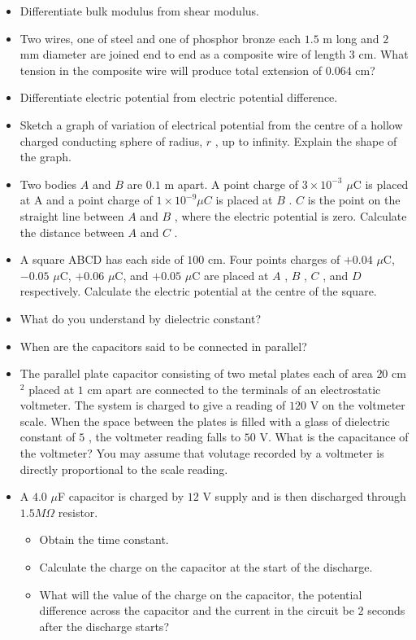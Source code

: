 \documentclass{article}
\begin{document}
\begin{itemize}
\item Differentiate bulk modulus from shear modulus.
\item Two wires, one of steel and one of phosphor bronze each $ 1.5$ m long and $ 2$ mm diameter are joined end to end as a composite wire of length $ 3$ cm.  What tension in the composite wire will produce total extension of $ 0.064$ cm?
\item Differentiate electric potential from electric potential difference.
\item Sketch a graph of variation of electrical potential from the centre of a hollow charged conducting sphere of radius, $ r$ , up to infinity.  Explain the shape of the graph.
\item Two bodies $ A$ and $ B$ are $ 0.1$ m apart.  A point charge of $ 3\times 10^{-3}$ $\mu$C is placed at A and a point charge of $ 1\times 10^{-9}\mu C$ is placed at $ B$ .  $ C$ is the point on the straight line between $ A$ and $ B$ , where the electric potential is zero.  Calculate the distance between $ A$ and $ C$ .
\item A square ABCD has each side of $ 100$ cm.  Four points charges of $ +0.04$ $\mu$C, $ -0.05$ $\mu$C, $ +0.06$ $\mu$C, and $ +0.05$ $\mu$C are placed at $ A$ , $ B$ , $ C$ , and $ D$ respectively.  Calculate the electric potential at the centre of the square.
\item What do you understand by dielectric constant?
\item When are the capacitors said to be connected in parallel?
\item The parallel plate capacitor consisting of two metal plates each of area $ 20$ cm$ ^{2}$ placed at $ 1$ cm apart are connected to the terminals of an electrostatic voltmeter.  The system is charged to give a reading of $ 120$ V on the voltmeter scale.  When the space between the plates is filled with a glass of dielectric constant of $ 5$ , the voltmeter reading falls to $ 50$ V.  What is the capacitance of the voltmeter?  You may assume that volutage recorded by a voltmeter is directly proportional to the scale reading.
\item A $ 4.0$ $\mu$F capacitor is charged by $ 12$ V supply and is then discharged through $ 1.5M\Omega $ resistor.  
 \begin{itemize}
\item Obtain the time constant.
\item Calculate the charge on the capacitor at the start of the discharge.
\item What will the value of the charge on the capacitor, the potential difference across the capacitor and the current in the circuit be $ 2$ seconds after the discharge starts?

\end{itemize}
\end{itemize}
\end{document}
